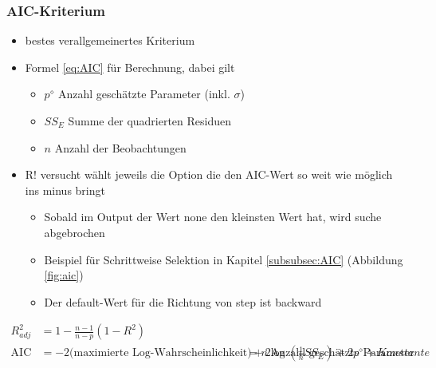 \subsubsection{AIC-Kriterium}
\begin{itemize}
	\item bestes verallgemeinertes Kriterium
	\item Formel \ref{eq:AIC} für Berechnung, dabei gilt
	\begin{itemize}
		\item $p^\diamond$  Anzahl geschätzte Parameter (inkl. $\sigma$)
		\item $SS_E$ Summe der quadrierten Residuen
		\item $n$ Anzahl der Beobachtungen
	\end{itemize}
	\item R! versucht wählt jeweils die Option die den AIC-Wert so weit wie möglich ins minus bringt
	\begin{itemize}
		\item Sobald im Output der Wert \glq none \grq den kleinsten Wert hat, wird suche abgebrochen
		\item Beispiel für Schrittweise Selektion in Kapitel \ref{subsubsec:AIC} (Abbildung \ref{fig:aic})
		\item Der default-Wert für die Richtung von step ist \glqq backward \grqq
	\end{itemize}
\end{itemize}
\begin{align}
	\label{eq:AdjR2}
	R_{adj}^2 &=1-\frac{n-1}{n-p}\left(1-R^2\right)\\
	\label{eq:AIC}
	\text{AIC}&= -2\text{(maximierte Log-Wahrscheinlichkeit)} +2\text{Anzahl geschätzte Parameter}
			  &=n \log\left(\frac{1}{n}SS_E\right)+2p^\diamond+Konstante
\end{align}



